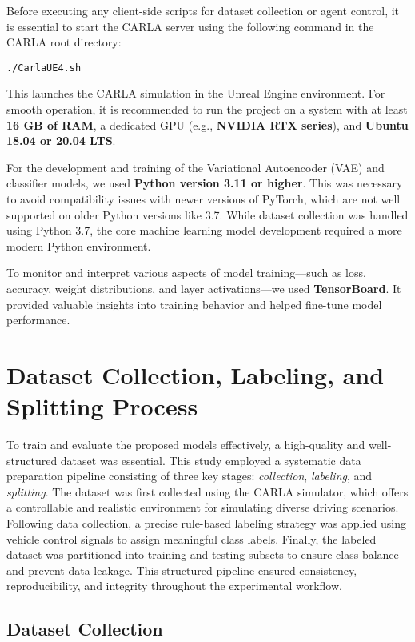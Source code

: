 Before executing any client-side scripts for dataset collection or agent control, it is essential to start the CARLA server using the following command in the CARLA root directory:

\begin{verbatim}
./CarlaUE4.sh
\end{verbatim}

This launches the CARLA simulation in the Unreal Engine environment. For smooth operation, it is recommended to run the project on a system with at least \textbf{16 GB of RAM}, a dedicated GPU (e.g., \textbf{NVIDIA RTX series}), and \textbf{Ubuntu 18.04 or 20.04 LTS}. 

For the development and training of the Variational Autoencoder (VAE) and classifier models, we used \textbf{Python version 3.11 or higher}. This was necessary to avoid compatibility issues with newer versions of PyTorch, which are not well supported on older Python versions like 3.7. While dataset collection was handled using Python 3.7, the core machine learning model development required a more modern Python environment.  

To monitor and interpret various aspects of model training—such as loss, accuracy, weight distributions, and layer activations—we used \textbf{TensorBoard}. It provided valuable insights into training behavior and helped fine-tune model performance.

\section{Dataset Collection, Labeling, and Splitting Process}

To train and evaluate the proposed models effectively, a high-quality and well-structured dataset was essential. This study employed a systematic data preparation pipeline consisting of three key stages: \textit{collection}, \textit{labeling}, and \textit{splitting}. The dataset was first collected using the CARLA simulator, which offers a controllable and realistic environment for simulating diverse driving scenarios. Following data collection, a precise rule-based labeling strategy was applied using vehicle control signals to assign meaningful class labels. Finally, the labeled dataset was partitioned into training and testing subsets to ensure class balance and prevent data leakage. This structured pipeline ensured consistency, reproducibility, and integrity throughout the experimental workflow.

\subsection{Dataset Collection}

